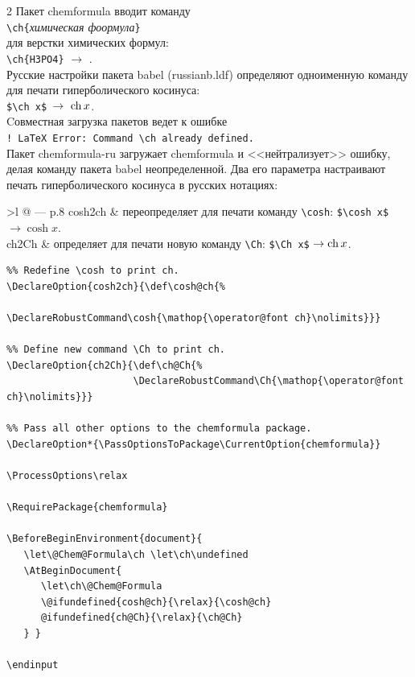 \documentclass[a4paper]{article}
\begin{document}
\begin{multicols}{2}
Пакет \textsf{chemformula} вводит команду\\[.5ex]
\mbox{}\hfil\verb|\сh{|\textit{химическая фоормула}\verb|}|\\[.5ex]
для верстки химических формул:\\[.5ex]
\mbox{}\hfil\verb|\ch{H3PO4}| $\to$ .\\[.5ex]
Русские настройки пакета \textsf{babel (russianb.ldf)} определяют одноименную команду для печати гиперболического косинуса:\\[-.85\baselineskip]
\mbox{}\hfil\verb|$\ch x$|\ $\to\ \Ch x$.\\[.5ex]
Cовместная загрузка пакетов ведет к ошибке\\[1ex]
\mbox{}\hfil\verb|! LaTeX Error: Command \ch already defined.|\\[1ex]
Пакет \textsf{chemformula-ru} загружает \textsf{chemformula} и <<нейтрализует>> ошибку, делая команду пакета \textsf{babel} неопределенной.
Два его параметра настраивают печать гиперболического косинуса в русских нотациях:\\[1ex]
\begin{tabular}{>\sf l @{ --- } p{.8\linewidth}}
cosh2ch & переопределяет для печати команду \verb|\cosh|:\linebreak
          \verb|$\cosh x$| $\to \cosh x$.  \\[1ex]
ch2Ch & определяет для печати новую команду \verb|\Ch|:\linebreak
         \verb|$\Ch x$| $\to \Ch x$.
\end{tabular}
\end{multicols}

\thispagestyle{empty}

\noindent\hrulefill

\begin{verbatim}
%% Redefine \cosh to print ch.
\DeclareOption{cosh2ch}{\def\cosh@ch{%
                        \DeclareRobustCommand\cosh{\mathop{\operator@font ch}\nolimits}}}

%% Define new command \Ch to print ch.
\DeclareOption{ch2Ch}{\def\ch@Ch{%
                      \DeclareRobustCommand\Ch{\mathop{\operator@font ch}\nolimits}}}

%% Pass all other options to the chemformula package.
\DeclareOption*{\PassOptionsToPackage\CurrentOption{chemformula}}

\ProcessOptions\relax

\RequirePackage{chemformula}

\BeforeBeginEnvironment{document}{
   \let\@Chem@Formula\ch \let\ch\undefined
   \AtBeginDocument{ 
      \let\ch\@Chem@Formula 
      \@ifundefined{cosh@ch}{\relax}{\cosh@ch}
      @ifundefined{ch@Ch}{\relax}{\ch@Ch}
   } }

\endinput
\end{verbatim}
\end{document}
